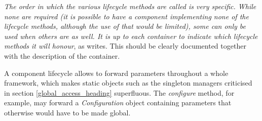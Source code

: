 \textit{The order in which the various lifecycle methods are called is very
specific. While none are required (it is possible to have a component
implementing none of the lifecycle methods, although the use of that would be
limited), some can only be used when others are as well. It is up to each
container to indicate which lifecycle methods it will honour}, as \cite{avalon}
writes. This should be clearly documented together with the description of the
container.

A component lifecycle allows to forward parameters throughout a whole framework,
which makes static objects such as the singleton managers criticised in section
\ref{global_access_heading} superfluous. The \emph{configure} method, for
example, may forward a \emph{Configuration} object containing parameters that
otherwise would have to be made global.
